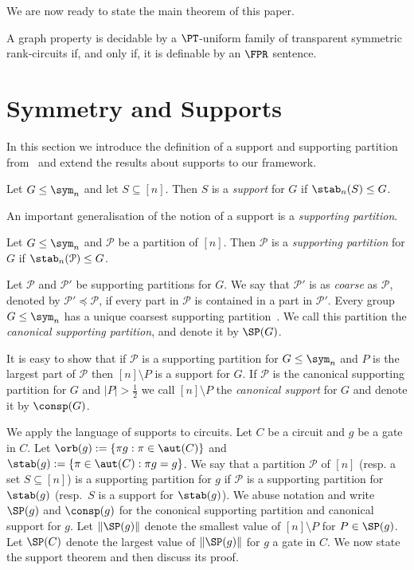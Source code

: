 \documentclass[a4paper,UKenglish]{lipics-v2018}
\begin{document}
We are now ready to state the main theorem of this paper.

\begin{theorem}
  A graph property is decidable by a $\PT$-uniform family of transparent
  symmetric rank-circuits if, and only if, it is definable by an $\FPR$
  sentence.
\end{theorem}


\section{Symmetry and Supports}
In this section we introduce the definition of a support and
supporting partition from~\cite{AndersonD17} and extend the results
about supports to our framework.

\begin{definition}
  Let $G \leq \sym_n$ and let $S \subseteq [n]$. Then $S$ is a \emph{support}
  for $G$ if $\stab_n(S) \leq G$.
\end{definition}

An important generalisation of the notion of a support is a \emph{supporting
  partition}.

\begin{definition}
  Let $G \leq \sym_n$ and $\mathcal{P}$ be a partition of $[n]$. Then
  $\mathcal{P}$ is a \emph{supporting partition} for $G$ if
  $\stab_n(\mathcal{P}) \leq G$.
\end{definition}

Let $\mathcal{P}$ and $\mathcal{P}'$ be supporting partitions for $G$. We say
that $\mathcal{P}'$ is as \emph{coarse} as $\mathcal{P}$, denoted by
$\mathcal{P}' \preceq \mathcal{P}$, if every part in $\mathcal{P}$ is contained
in a part in $\mathcal{P}'$.  Every group $G \leq
\sym_n$ has a unique coarsest supporting partition~\cite{AndersonD17}. We call this partition the
\emph{canonical supporting partition}, and denote it by $\SP (G)$.

It is easy to show that if $\mathcal{P}$ is a supporting partition for $G \leq
\sym_n$ and $P$ is the largest part of $\mathcal{P}$ then $[n] \setminus P$ is a
support for $G$. If $\mathcal{P}$ is the canonical supporting partition for $G$
and $\vert P \vert > \frac{1}{2}$ we call $[n] \setminus P$ the \emph{canonical
  support} for $G$ and denote it by $\consp(G)$.

We apply the language of supports to circuits. Let $C$ be a circuit and $g$ be a
gate in $C$. Let $\orb(g) := \{\pi g : \pi \in \aut(C)\}$ and $\stab (g) := \{
\pi \in \aut(C) : \pi g = g \}$. We say that a partition $\mathcal{P}$ of $[n]$
(resp. a set $S \subseteq [n]$) is a supporting partition for $g$ if
$\mathcal{P}$ is a supporting partition for $\stab(g)$ (resp.\ $S$ is a support
for $\stab(g)$). We abuse notation and write $\SP(g)$ and $\consp(g)$ for the
cononical supporting partition and canonical support for $g$. Let $\| \SP(g) \|$
denote the smallest value of $[n] \setminus P$ for $P \in \SP(g)$. Let $\SP(C)$
denote the largest value of $\| \SP(g) \|$ for $g$ a gate in $C$. We now state
the support theorem and then discuss its proof.
\end{document}
